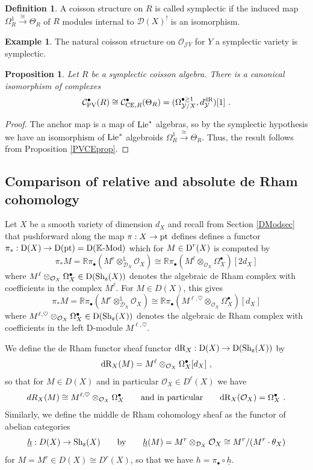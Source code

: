 \documentclass[11pt]{amsart}
\numberwithin{equation}{section}
\newtheorem{prop}[theo]{Proposition}
\theoremstyle{definition}
\newtheorem{defn}[theo]{Definition}
\newtheorem{eg}[theo]{Example}
\newcommand{\bb}{\mathbb}
\newcommand{\mc}{\mathcal}
\newcommand{\D}{{\mathcal{D}}}
\newcommand{\Mod}{{\textup{-Mod}}}
\newcommand{\K}{{\bb K}}
\newcommand{\CE}{{\textup{CE}}}
\newcommand{\dR}{{\textup{dR}}}
\newcommand{\Sh}{{\textup{Sh}}}
\newcommand{\Lie}{{\textup{Lie}}}
\newcommand{\pt}{{\textup{pt}}}
\newcommand{\z}{{\textup{z}}}
\newcommand{\PV}{{{\textup{PV}}}}
\newcommand{\0}{{\textbf{0}}}
\newcommand{\Dd}{{\textup{D}}}
\newcommand{\DD}{{D}}
\def\YY{{\mc Y}}
\begin{document}
\begin{defn} A coisson structure on $R$ is called symplectic if the induced map $\Omega^1_R\xrightarrow{\cong} \Theta_R$ of $R$ modules internal to $\D(X)^!$ is an isomorphism.
\end{defn}

\begin{eg}The natural coisson structure on $\mc O_{\mc J Y}$ for $Y$ a symplectic variety is symplectic.
\end{eg}


\begin{prop}\label{prop:int PV is de Rham}
Let $R$ be a symplectic coisson algebra. There is a canonical isomorphism of complexes
	\[ 
	\mathcal{C}_\PV^\bullet(R) \cong \mc C^{\bullet}_{\CE,R}(\Theta_R)= (\Omega^{\bullet\ge1}_{\YY/X},d_{\YY}^\dR)[1] \ .  
	\]
\end{prop}
\begin{proof} The anchor map is a map of $\Lie^*$ algebras, so by the symplectic hypothesis we have an isomorphism of $\Lie^*$ algebroids $\Omega^1_R\xrightarrow{\cong} \Theta_R$. Thus, the result follows from Proposition \ref{PVCEprop}.
	
\end{proof}




\subsection{Comparison of relative and absolute de Rham cohomology}\label{reldRsec}


Let $X$ be a smooth variety of dimension $d_X$ and recall from Section \ref{DModsec} that pushforward along the map $\pi:X\to \pt$ defines defines a functor $\pi_*:\Dd(X)\to \Dd(\pt)=\Dd(\K\Mod)$ which for $M\in \Dd^r(X)$ is computed by
\[ \pi_*M=\bb R\pi_\bullet( M^r\otimes^{\bb L}_{\mc D_X} \mc O_X) \cong \bb R\pi_\bullet( M^\ell \otimes_{\mc O_X} \Omega^\bullet_X )[2d_X] \]
where $ M^\ell \otimes_{\mc O_X} \Omega^\bullet_X\in \Dd(\Sh_\z(X))$ denotes the algebraic de Rham complex with coefficients in the complex $M^\ell$. For $M\in \DD(X)$, this gives
\[\pi_*M=\bb R\pi_\bullet( M^r\otimes^{\bb L}_{\mc D_X} \mc O_X) \cong \bb R\pi_\bullet( M^{\ell,\heartsuit} \otimes_{\mc O_X} \Omega^\bullet_X )[d_X] \]
where $ M^{\ell,\heartsuit} \otimes_{\mc O_X} \Omega^\bullet_X\in \Dd(\Sh_\z(X))$ denotes the algebraic de Rham complex with coefficients in the left D-module $M^{\ell,\heartsuit}$.

We define the de Rham functor sheaf functor $\dR_X:\Dd(X) \to \Dd(\Sh_\z(X))$ by
\[ \dR_X(M) = M^\ell \otimes_{\mc O_X} \Omega^\bullet_X [d_X] \ , \]
so that for $M\in \DD(X)$ and in particular $\mc O_X\in \DD^\ell(X)$ we have
\[ dR_X(M) \cong  M^{\ell,\heartsuit} \otimes_{\mc O_X} \Omega^\bullet_X \qquad \text{and in particular} \qquad \dR_X(\mc O_X) = \Omega^\bullet_X \ .\]
Similarly, we define the middle de Rham cohomology sheaf as the functor of abelian categories
\[ \underline{h}:\DD(X)\to \Sh_\z(X) \qquad \text{by}\qquad \underline{h}(M)=M^r\otimes_{\mc D_X} \mc O_X \cong M^r/(M^r\cdot \theta_X) \]
for $M=M^r\in \DD(X)\cong \DD^r(X)$, so that we have $h=\pi_\bullet \circ \underline{h}$.
\end{document}
